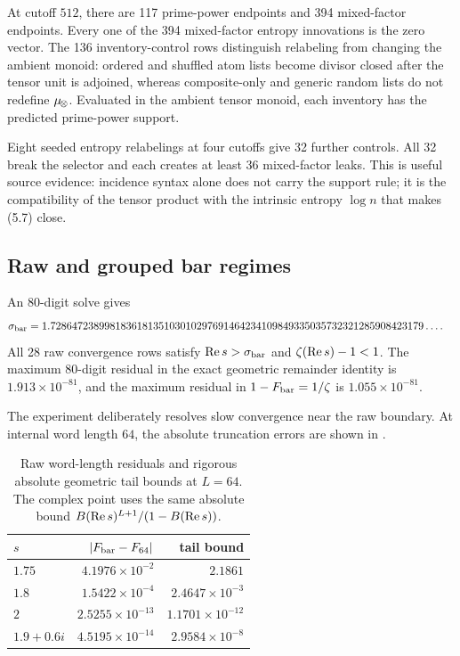 At cutoff $512$, there are 117 prime-power endpoints and 394 mixed-factor
endpoints.  Every one of the 394 mixed-factor entropy innovations is the zero
vector.  The 136 inventory-control rows distinguish relabeling from changing
the ambient monoid: ordered and shuffled atom lists become divisor closed
after the tensor unit is adjoined, whereas composite-only and generic random
lists do not redefine $\mu_{\!\otimes}$.  Evaluated in the ambient tensor monoid, each
inventory has the predicted prime-power support.

Eight seeded entropy relabelings at four cutoffs give 32 further controls.
All 32 break the selector and each creates at least 36 mixed-factor leaks.
This is useful source evidence: incidence syntax alone does not carry the
support rule; it is the compatibility of the tensor product with the
intrinsic entropy $\log n$ that makes (5.7) close.

\subsection{Raw and grouped bar regimes}

An 80-digit solve gives
\[
\begin{split}
\sigma_{\rm bar}={}&1.728647238998183618135103010297691464234109849335035732321285908423179
\ldots.
\end{split}
\]
All 28 raw convergence rows satisfy $\operatorname{Re} s>\sigma_{\rm bar}$ and
$\zeta(\operatorname{Re} s)-1<1$.  The maximum 80-digit residual in the exact geometric
remainder identity is $1.913\times10^{-81}$, and the maximum residual in
$1-F_{\rm bar}=1/\zeta$ is $1.055\times10^{-81}$.

The experiment deliberately resolves slow convergence near the raw boundary.
At internal word length $64$, the absolute truncation errors are shown in
.

\begin{table}[t]
\centering
\caption{Raw word-length residuals and rigorous absolute geometric tail
bounds at $L=64$.  The complex point uses the same absolute bound
$B(\operatorname{Re} s)^{L+1}/(1-B(\operatorname{Re} s))$.}
\label{tab:raw}
\begin{tabular}{lrr}
\toprule
$s$ & $|F_{\rm bar}-F_{64}|$ & tail bound\\
\midrule
$1.75$ & $4.1976\times10^{-2}$ & $2.1861$\\
$1.8$ & $1.5422\times10^{-4}$ & $2.4647\times10^{-3}$\\
$2$ & $2.5255\times10^{-13}$ & $1.1701\times10^{-12}$\\
$1.9+0.6i$ & $4.5195\times10^{-14}$ & $2.9584\times10^{-8}$\\
\bottomrule
\end{tabular}
\end{table}

